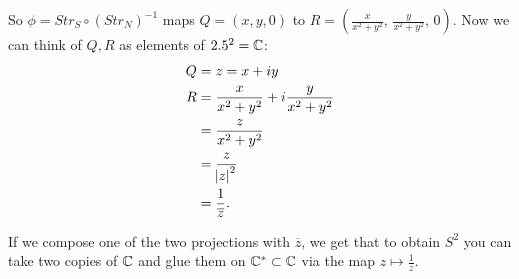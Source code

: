 So $\phi = Str_S \circ (Str_N)^{-1}$ maps $Q = (x,y,0)$ to $R = \left( \frac{x}{x^2+y^2} , \, \frac{y}{x^2+y^2} , \, 0         \right)$. Now we can think of $Q,R$ as elements of $2.5^2 = \mathbb{C}$:
\begin{align*}
    Q &= z = x+iy\\
    R &= \frac{x}{x^2 + y^2} + i \frac{y}{x^2 + y^2}\\
    &= \frac{z}{x^2 + y^2}\\
    &= \frac{z}{\abs{z}^2}\\ &= \frac{1}{\overline{z}}.
\end{align*}



If we compose one of the two projections with $\overline{z}$, we get that to obtain $S^2$ you can take two copies of $\mathbb{C}$ and glue them on $\mathbb{C}^* \subset \mathbb{C}$ via the map $z \mapsto \frac{1}{z}$.

